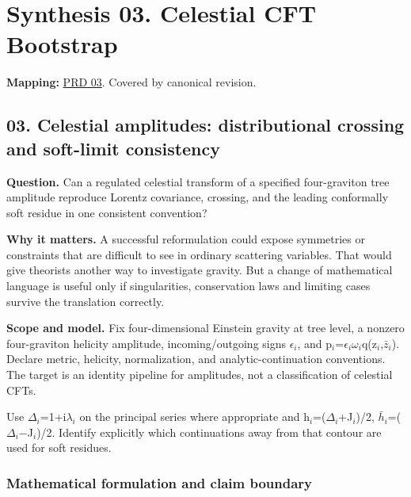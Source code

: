 \documentclass[
  11pt,
]{article}
\begin{document}
\section{Synthesis 03. Celestial CFT Bootstrap}

\textbf{Mapping:}
\href{https://github.com/rick-stevens-ai/Pure-Thought/blob/main/PRDs/03-Celestial-CFT-Bootstrap.md}{PRD
03}. Covered by canonical revision.

\subsection{03. Celestial amplitudes: distributional crossing and
soft-limit consistency}

\textbf{Question.} Can a regulated celestial transform of a specified
four-graviton tree amplitude reproduce Lorentz covariance, crossing, and
the leading conformally soft residue in one consistent convention?

\textbf{Why it matters.} A successful reformulation could expose
symmetries or constraints that are difficult to see in ordinary
scattering variables. That would give theorists another way to
investigate gravity. But a change of mathematical language is useful
only if singularities, conservation laws and limiting cases survive the
translation correctly.

\textbf{Scope and model.} Fix four-dimensional Einstein gravity at tree
level, a nonzero four-graviton helicity amplitude, incoming/outgoing
signs \ensuremath{\epsilon}\ensuremath{{}_{i}}, and
p\ensuremath{{}_{i}}=\ensuremath{\epsilon}\ensuremath{{}_{i}}\ensuremath{\omega}\ensuremath{{}_{i}}q(z\ensuremath{{}_{i}},\ensuremath{\bar{z}}\ensuremath{{}_{i}}).
Declare metric, helicity, normalization, and analytic-continuation
conventions. The target is an identity pipeline for amplitudes, not a
classification of celestial CFTs.

Use
\ensuremath{\Delta}\ensuremath{{}_{i}}=1+i\ensuremath{\lambda}\ensuremath{{}_{i}}
on the principal series where appropriate and
h\ensuremath{{}_{i}}=(\ensuremath{\Delta}\ensuremath{{}_{i}}+J\ensuremath{{}_{i}})/2,
\ensuremath{\bar{h}}\ensuremath{{}_{i}}=(\ensuremath{\Delta}\ensuremath{{}_{i}}\ensuremath{-}J\ensuremath{{}_{i}})/2.
Identify explicitly which continuations away from that contour are used
for soft residues.

\subsubsection{Mathematical formulation and claim boundary}
\end{document}
